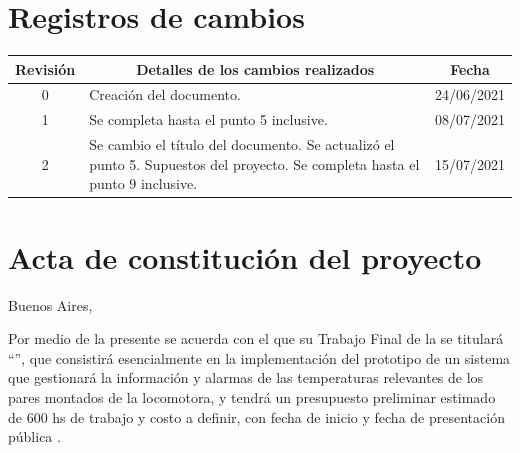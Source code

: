 \documentclass[
11pt, %
codirector, %
]{charter}
\begin{document}
\maketitle
\thispagestyle{empty}
\pagebreak


\thispagestyle{empty}
{\setlength{\parskip}{0pt}
\tableofcontents{}
}
\pagebreak


\section*{Registros de cambios}
\label{sec:registro}


\begin{table}[ht]
\label{tab:registro}
\centering
\begin{tabularx}{\linewidth}{@{}|c|X|c|@{}}
\hline
\rowcolor[HTML]{C0C0C0} 
Revisión & \multicolumn{1}{c|}{\cellcolor[HTML]{C0C0C0}Detalles de los cambios realizados} & Fecha      \\ \hline
0      & Creación del documento.                                 &24/06/2021\\ \hline
1      & Se completa hasta el punto 5 inclusive.                 & 08/07/2021 \\ \hline
2      & Se cambio el título del documento.\newline
		 Se actualizó el punto 5. Supuestos del proyecto.\newline  
		 Se completa hasta el punto 9 inclusive.      		      & 15/07/2021 \\ \hline
\end{tabularx}
\end{table}

\pagebreak



\section*{Acta de constitución del proyecto}
\label{sec:acta}

\begin{flushright}
Buenos Aires, \fechaInicioName
\end{flushright}

\vspace{2cm}

Por medio de la presente se acuerda con el \authorname\hspace{1px} que su Trabajo Final de la \degreename\hspace{1px} se titulará ``\ttitle'', que consistirá esencialmente en la implementación del prototipo de un sistema que gestionará la información y alarmas de las temperaturas relevantes de los pares montados de la locomotora, y tendrá un presupuesto preliminar estimado de 600 hs de trabajo y costo a definir, con fecha de inicio \fechaInicioName\hspace{1px} y fecha de presentación pública \fechaFinalName.
\end{document}
